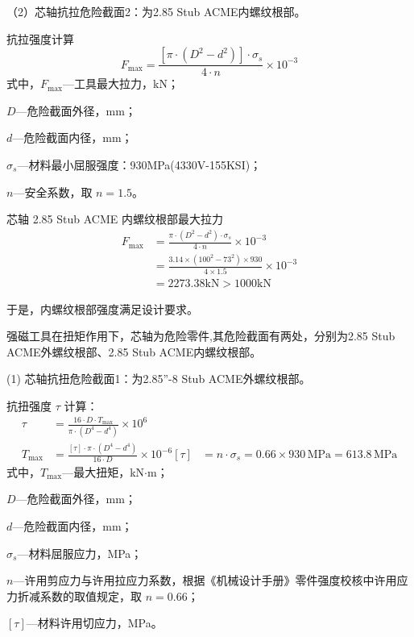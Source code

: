 （2）芯轴抗拉危险截面2：为2.85 Stub ACME内螺纹根部。

抗拉强度计算
\begin{equation}
    F_{\max} = \frac{[\pi \cdot (D^2 - d^2)] \cdot \sigma_s}{4 \cdot n} \times 10^{-3}
\end{equation}
式中，$F_{\max}$---工具最大拉力，kN；

$D$---危险截面外径，mm；

$d$---危险截面内径，mm；

$\sigma_s$---材料最小屈服强度：930MPa(4330V-155KSI)；

$n$---安全系数，取 $n = 1.5$。

芯轴 2.85 Stub ACME 内螺纹根部最大拉力
\begin{align}
    F_{\max} &= \frac{\pi \cdot (D^2 - d^2) \cdot \sigma_s}{4 \cdot n} \times 10^{-3} \\
             &= \frac{3.14 \times (100^2 - 73^2) \times 930}{4 \times 1.5} \times 10^{-3} \\
             &= 2273.38 \text{kN} > 1000 \text{kN}
\end{align}

于是，内螺纹根部强度满足设计要求。


强磁工具在扭矩作用下，芯轴为危险零件,其危险截面有两处，分别为2.85 Stub ACME外螺纹根部、2.85 Stub ACME内螺纹根部。

(1)	芯轴抗扭危险截面1：为2.85”-8 Stub ACME外螺纹根部。

抗扭强度 $\tau$ 计算：
\begin{equation}
\begin{aligned}
    \tau &= \frac{16 \cdot D \cdot T_{\max}}{\pi \cdot (D^4 - d^4)} \times 10^6 \\
    T_{\max} &= \frac{[\tau] \cdot \pi \cdot (D^4 - d^4)}{16 \cdot D} \times 10^{-6}
    [\tau] &= n \cdot \sigma_s = 0.66 \times 930\,\text{MPa} = 613.8\,\text{MPa}
\end{aligned}
\end{equation}
式中，$T_{\max}$---最大扭矩，kN$\cdot$m；

$D$---危险截面外径，mm；

$d$---危险截面内径，mm；

$\sigma_s$---材料屈服应力，MPa；

$n$---许用剪应力与许用拉应力系数，根据《机械设计手册》零件强度校核中许用应力折减系数的取值规定\cite{ref26}，取 $n = 0.66$；

$[\tau]$---材料许用切应力，MPa。

